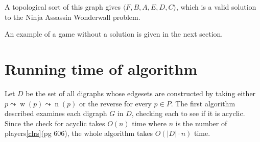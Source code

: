 \documentclass[12pt,x11names, rgb]{article}
\DeclareMathOperator{\w}{w}
\DeclareMathOperator{\n}{n}
\begin{document}
\begin{center}

    \end{center}

    A topological sort of this graph gives $\langle F, B, A, E, D, C \rangle$, which is a valid solution to the Ninja Assassin Wonderwall problem. 

    An example of a game without a solution is given in the next section.

\section{Running time of algorithm}
    Let $D$ be the set of all digraphs whose edgesets are constructed by taking either $p \leadsto \w(p) \leadsto \n(p)$ or the reverse for every $p\in P$. The first algorithm described examines each digraph $G$ in $D$, checking each to see if it is acyclic. Since the check for acyclic takes $O(n)$ time where $n$ is the number of players\ref{clrs}(pg 606), the whole algorithm takes $O(\lvert D \rvert \cdot n)$ time. 
\end{document}
